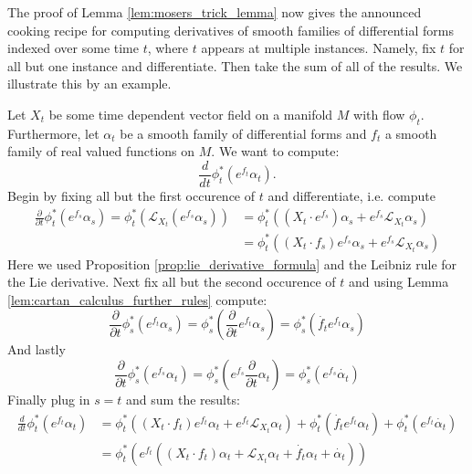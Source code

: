 
The proof of Lemma \ref{lem:mosers_trick_lemma} now gives the announced cooking recipe for computing derivatives of smooth families of differential forms indexed over some time $t$, where $t$ appears at multiple instances. Namely, fix $t$ for all but one instance and differentiate. Then take the sum of all of the results. We illustrate this by an example.

\begin{example}
    Let $X_t$ be some time dependent vector field on a manifold $M$ with flow $\phi_t$. Furthermore, let $\alpha_t$ be a smooth family of differential forms and $f_t$ a smooth family of real valued functions on $M$. We want to compute:
    \[
    \frac{d}{dt}\phi_t^\ast(e^{f_t}\alpha_t).
    \]
    Begin by fixing all but the first occurence of $t$ and differentiate, i.e. compute
    \begin{align*}
        \frac{\partial}{\partial t} \phi_t^\ast(e^{f_s}\alpha_s) = \phi_t^\ast(\mathcal{L}_{X_t}(e^{f_s}\alpha_s)) &= \phi_t^\ast((X_t \cdot e^{f_s})\alpha_s + e^{f_s}\mathcal{L}_{X_t}\alpha_s)\\ &= \phi_t^\ast((X_t \cdot f_s) e^{f_s} \alpha_s + e^{f_s}\mathcal{L}_{X_t}\alpha_s)
    \end{align*}
    Here we used Proposition \ref{prop:lie_derivative_formula} and the Leibniz rule for the Lie derivative. Next fix all but the second occurence of $t$ and using Lemma \ref{lem:cartan_calculus_further_rules} compute:
    \[
        \frac{\partial}{\partial t} \phi_s^\ast(e^{f_t}\alpha_s) = \phi_s^\ast(\frac{\partial }{\partial t}e^{f_t}\alpha_s) = \phi_s^\ast(\dot{f_t}e^{f_t}\alpha_s)
    \]
    And lastly
    \[
        \frac{\partial }{\partial t} \phi_s^\ast(e^{f_s}\alpha_t) = \phi_s^\ast(e^{f_s}\frac{\partial }{\partial t} \alpha_t) = \phi_s^\ast(e^{f_s}\dot{\alpha_t})
    \]
    Finally plug in $s=t$ and sum the results:
    \begin{align*}
        \frac{d}{dt}\phi_t^\ast(e^{f_t}\alpha_t) &= \phi_t^\ast((X_t \cdot f_t) e^{f_t} \alpha_t + e^{f_t}\mathcal{L}_{X_t}\alpha_t) + \phi_t^\ast(\dot{f_t}e^{f_t}\alpha_t) + \phi_t^\ast(e^{f_t}\dot{\alpha_t})\\
        &= \phi_t^\ast(e^{f_t}((X_t \cdot f_t) \alpha_t + \mathcal{L}_{X_t}\alpha_t + \dot{f_t}\alpha_t + \dot{\alpha_t}))
    \end{align*}
\end{example}